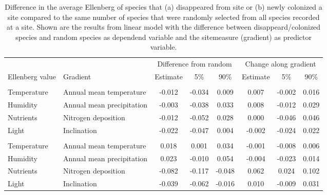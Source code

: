 \documentclass[fleqn,10pt,lineno]{wlpeerj} %
\theoremstyle{definition}
\theoremstyle{definition}
\theoremstyle{definition}
\theoremstyle{remark}
\begin{document}
\begin{table}

\caption{\label{tab:difffromrandomtab}Difference in the average Ellenberg of species that (a) disappeared from site or (b) newly colonized a site compared to the same number of species that were randomly selected from all species recorded at a site. Shown are the results from linear model with the difference between disappeard/colonized species and random species as dependend variable and the sitemeasure (gradient) as predictor variable.}
\centering
\begin{tabular}[t]{llcccccc}
\toprule
\multicolumn{2}{c}{ } & \multicolumn{3}{c}{Difference from random} & \multicolumn{3}{c}{Change along gradient} \\
\cmidrule(l{2pt}r{2pt}){3-5} \cmidrule(l{2pt}r{2pt}){6-8}
Ellenberg value & Gradient & Estimate & 5\% & 90\% & Estimate & 5\% & 90\%\\
\midrule
\addlinespace[0.3em]
\multicolumn{8}{l}{\textit{(a) Plants that disappeard from a site}}\\
\hspace{1em}Temperature & Annual mean temperature & -0.012 & -0.034 & 0.009 & 0.007 & -0.002 & 0.016\\
\hspace{1em}Humidity & Annual mean precipitation & -0.003 & -0.038 & 0.033 & 0.008 & -0.012 & 0.029\\
\hspace{1em}Nutrients & Nitrogen deposition & -0.012 & -0.052 & 0.028 & 0.000 & -0.046 & 0.046\\
\hspace{1em}Light & Inclination & -0.022 & -0.047 & 0.004 & -0.002 & -0.024 & 0.022\\
\addlinespace[0.3em]
\multicolumn{8}{l}{\textit{(b) Plants that newly colonized a site}}\\
\hspace{1em}Temperature & Annual mean temperature & 0.018 & 0.001 & 0.034 & -0.001 & -0.008 & 0.006\\
\hspace{1em}Humidity & Annual mean precipitation & 0.023 & -0.010 & 0.054 & -0.004 & -0.023 & 0.014\\
\hspace{1em}Nutrients & Nitrogen deposition & -0.082 & -0.117 & -0.048 & 0.062 & 0.024 & 0.102\\
\hspace{1em}Light & Inclination & -0.039 & -0.062 & -0.016 & 0.010 & -0.009 & 0.031\\
\bottomrule
\end{tabular}
\end{table}
\end{document}
